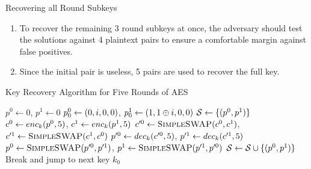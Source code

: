 \documentclass[notheorems]{beamer}
\theoremstyle{definition}
\theoremstyle{example}
\begin{document}
    \begin{frame}[<+->]{Recovering all Round Subkeys}
        \begin{enumerate}
            \item To recover the remaining 3 round subkeys at once, the
            adversary should test the solutions against 4 plaintext pairs to
            ensure a comfortable margin against false positives. 
            \item Since the initial pair is useless, 5 pairs are used to recover
            the full key.
        \end{enumerate} 
    \end{frame}

    \begin{frame}[allowframebreaks]{Key Recovery Algorithm for Five Rounds of AES}
        \label{alg:aes-5-rounds-key}
        \begin{algorithmic}[1]
                \State \(p^0 \gets 0\), \(p^1 \gets 0\)
                \State \(p_0^0 \gets (0, i, 0, 0)\), \(p_0^1 \gets (1, 1 
                \oplus i, 0, 0)\)
                \State \(\mathcal S \gets \{(p^0, p^1)\}\)
                    \State \(c^0 \gets enc_k(p^0, 5)\), \(c^1 \gets 
                    enc_k(p^1, 5)\)
                    \State \(c^{\prime 0} \gets \textsc{SimpleSWAP}(c^0,
                    c^1)\), \(c^{\prime 1} \gets \textsc{SimpleSWAP}(c^1,
                    c^0)\)
                    \State \(p^{\prime 0} \gets dec_k(c^{\prime 0}, 5)\),
                    \(p^{\prime 1} \gets dec_k(c^{\prime 1}, 5)\)
                    \State \(p^0 \gets \textsc{SimpleSWAP}(p^{\prime 0},
                    p^{\prime 1})\), \(p^1 \gets \textsc{SimpleSWAP}(p^{\prime
                    1}, p^{\prime 0})\)
                    \State \(\mathcal S \gets \mathcal S \cup \{(p^0, p^1)\}\)
                \EndWhile
                            \State Break and jump to next key
                        \EndIf
                    \EndFor
                    \State \Return \(k_0\)
                \EndFor
            \EndFor
        \end{algorithmic}
    \end{frame}
\end{document}
